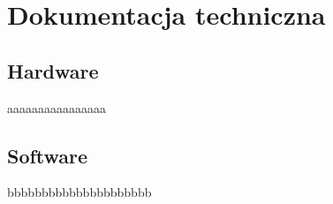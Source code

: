 \section{Dokumentacja techniczna}
\subsection{Hardware}
aaaaaaaaaaaaaaaa
\subsection{Software}
bbbbbbbbbbbbbbbbbbbbb